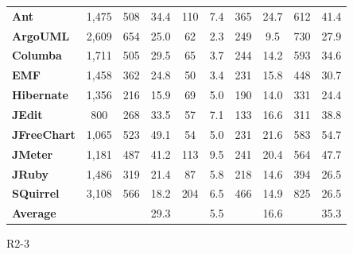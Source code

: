 {\begin{table}[!thb]
\begin{center}
\begin{tabular}{l| c c c c c c c c c  }
       \textbf{Ant}          & 1,475 & 508  & 34.4 & 110 & 7.4 & 365 & 24.7 & 612 & 41.4  \\
       \textbf{ArgoUML}      & 2,609 & 654  & 25.0 & 62  & 2.3 & 249 & 9.5  & 730 & 27.9  \\
       \textbf{Columba}      & 1,711 & 505  & 29.5 & 65  & 3.7 & 244 & 14.2 & 593 & 34.6  \\
       \textbf{EMF}          & 1,458 & 362  & 24.8 & 50  & 3.4 & 231 & 15.8 & 448 & 30.7  \\
       \textbf{Hibernate}    & 1,356 & 216  & 15.9 & 69  & 5.0 & 190 & 14.0 & 331 & 24.4  \\
       \textbf{JEdit}        & 800   & 268  & 33.5 & 57  & 7.1 & 133 & 16.6 & 311 & 38.8  \\
       \textbf{JFreeChart}   & 1,065 & 523  & 49.1 & 54  & 5.0 & 231 & 21.6 & 583 & 54.7  \\
       \textbf{JMeter}       & 1,181 & 487  & 41.2 & 113 & 9.5 & 241 & 20.4 & 564 & 47.7  \\
       \textbf{JRuby}        & 1,486 & 319  & 21.4 & 87  & 5.8 & 218 & 14.6 & 394 & 26.5  \\
       \textbf{SQuirrel}     & 3,108 & 566  & 18.2 & 204 & 6.5 & 466 & 14.9 & 825 & 26.5  \\
       \midrule
       \textbf{Average}      &       &      & 29.3  &    & 5.5  &    & 16.6 &     & 35.3  \\       
       \bottomrule
       \end{tabular}
   \end{center} 
\end{table} 

}{R2-3}
